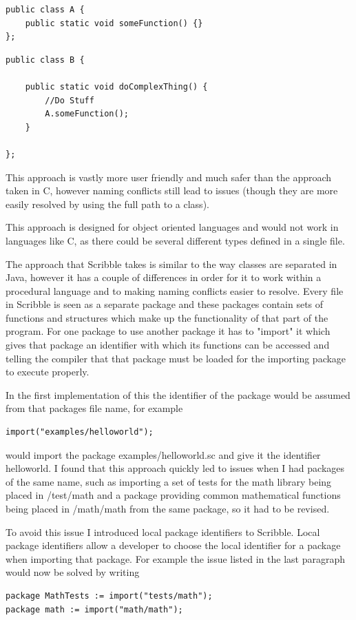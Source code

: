 \documentclass[]{final_report}
\begin{document}
\begin{verbatim}
public class A {
    public static void someFunction() {}
};
\end{verbatim}

\begin{verbatim}
public class B {

    public static void doComplexThing() {
        //Do Stuff
        A.someFunction();
    }

};
\end{verbatim}

This approach is vastly more user friendly and much safer than the approach taken in C, however naming conflicts still lead to issues (though they are more easily resolved by using the full path to a class).

This approach is designed for object oriented languages and would not work in languages like C, as there could be several different types defined in a single file.

The approach that Scribble takes is similar to the way classes are separated in Java, however it has a couple of differences in order for it to work within a procedural language and to making naming conflicts easier to resolve. Every file in Scribble is seen as a separate package and these packages contain sets of functions and structures which make up the functionality of that part of the program. For one package to use another package it has to "import" it which gives that package an identifier with which its functions can be accessed and telling the compiler that that package must be loaded for the importing package to execute properly.

In the first implementation of this the identifier of the package would be assumed from that packages file name, for example \begin{verbatim}import("examples/helloworld");\end{verbatim} would import the package examples/helloworld.sc and give it the identifier helloworld. I found that this approach quickly led to issues when I had packages of the same name, such as importing a set of tests for the math library being placed in /test/math and a package providing common mathematical functions being placed in /math/math from the same package, so it had to be revised.

To avoid this issue I introduced local package identifiers to Scribble. Local package identifiers allow a developer to choose the local identifier for a package when importing that package. For example the issue listed in the last paragraph would now be solved by writing
\begin{verbatim}
package MathTests := import("tests/math");
package math := import("math/math");
\end{verbatim}
\end{document}
